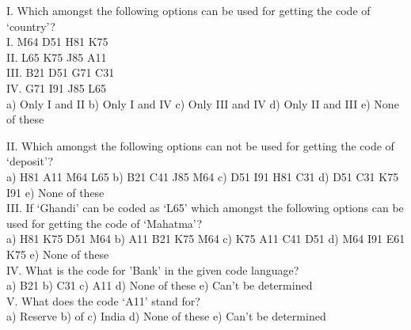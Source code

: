 \documentclass[
]{article}
\begin{document}
I. Which amongst the following options can be used for getting the code of ‘country’?\\
I. M64 D51 H81 K75\\
II. L65 K75 J85 A11\\
III. B21 D51 G71 C31\\
IV. G71 I91 J85 L65\\
a) Only I and II \hspace{1mm} b) Only I and IV \hspace{1mm} c) Only III and IV \hspace{1mm} d) Only II and III \hspace{1mm} e) None of these

II. Which amongst the following options can not be used for getting the code of ‘deposit’?\\
a) H81 A11 M64 L65 \hspace{1mm} b) B21 C41 J85 M64 \hspace{1mm} c) D51 I91 H81 C31 \hspace{1mm} d) D51 C31 K75 I91 \hspace{1mm} e) None of these\\
III. If ‘Ghandi’ can be coded as ‘L65’ which amongst the following options can be used for getting the code of ‘Mahatma’?\\
a) H81 K75 D51 M64 \hspace{1mm} b) A11 B21 K75 M64 \hspace{1mm} c) K75 A11 C41 D51 \hspace{1mm} d) M64 I91 E61 K75 \hspace{1mm} e) None of these\\

IV. What is the code for 'Bank' in the given code language?\\
a) B21 \hspace{1mm} b) C31 \hspace{1mm} c) A11
\hspace{1mm} d) None of these \hspace{1mm} e) Can’t be determined\\

V. What does the code ‘A11’ stand for?\\
a) Reserve \hspace{1mm} b) of \hspace{1mm} c) India \hspace{1mm} d) None of these \hspace{1mm} e) Can’t be determined
\end{document}
